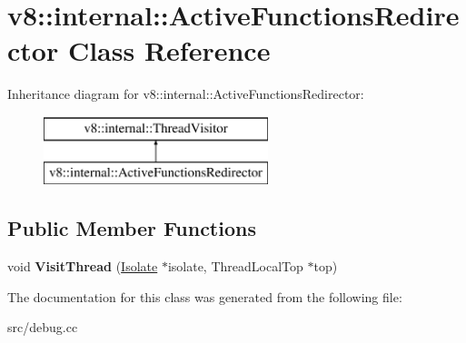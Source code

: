 \hypertarget{classv8_1_1internal_1_1_active_functions_redirector}{}\section{v8\+:\+:internal\+:\+:Active\+Functions\+Redirector Class Reference}
\label{classv8_1_1internal_1_1_active_functions_redirector}
Inheritance diagram for v8\+:\+:internal\+:\+:Active\+Functions\+Redirector\+:\begin{figure}[H]
\begin{center}
\leavevmode
\includegraphics[height=2.000000cm]{classv8_1_1internal_1_1_active_functions_redirector}
\end{center}
\end{figure}
\subsection*{Public Member Functions}
\begin{DoxyCompactItemize}
\item 
\hypertarget{classv8_1_1internal_1_1_active_functions_redirector_ae928f040839bf092dedde73493d1f89b}{}void {\bfseries Visit\+Thread} (\hyperlink{classv8_1_1internal_1_1_isolate}{Isolate} $\ast$isolate, Thread\+Local\+Top $\ast$top)\label{classv8_1_1internal_1_1_active_functions_redirector_ae928f040839bf092dedde73493d1f89b}

\end{DoxyCompactItemize}


The documentation for this class was generated from the following file\+:\begin{DoxyCompactItemize}
\item 
src/debug.\+cc\end{DoxyCompactItemize}
